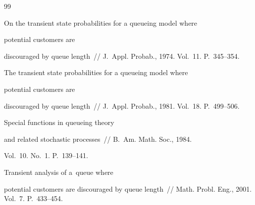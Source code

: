 {{\begin{thebibliography}{99}
\begin{figure}
\begin{center}
\end{center}

\vspace*{-15pt}


\vspace*{-5pt}

\end{figure}



 

    




 On the transient state probabilities for a queueing model where 

potential customers are

discouraged by queue length~/\!\!/ J.~Appl. Probab., 1974. Vol.~11. P.~345--354.




 The transient state probabilities for a queueing model where 

potential customers are

discouraged by queue length~/\!\!/ J.~Appl. Probab., 1981. Vol.~18. P.~499--506.   




 Special functions in queueing theory 

and related stochastic processes~/\!\!/ B.~Am. Math. Soc., 1984. 

Vol.~10. No.~1. P.~139--141.








 Transient analysis of a~queue where 

potential customers are discouraged by queue length~/\!\!/ Math. Probl. Eng., 2001. Vol.~7. P.~433--454.




\end{thebibliography}}}
